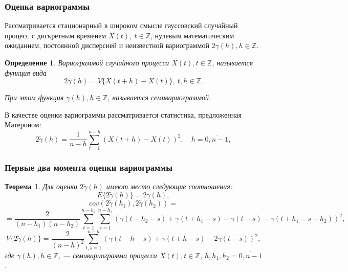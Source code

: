 \documentclass[10pt,pdf,aspectratio=169,hyperref={unicode}]{beamer}
\newtheorem{Definition}{Определение}
\newtheorem{Theorem}{Теорема}
\begin{document}
\begin{frame}
  \frametitle{Оценка вариограммы}
  Рассматривается стационарный в широком смысле гауссовский случайный процесс с дискретным временем $ X(t),~ t \in \mathbb{Z} $, нулевым математическим ожиданием, постоянной дисперсией и неизвестной вариограммой $ 2 \gamma(h), h \in \mathbb{Z} $.
  \begin{Definition}
    \textit{Вариограммой} случайного процесса $ X(t), t \in \mathbb{Z} $, называется функция вида
    \begin{equation}
        2 \gamma (h) = V \{ X(t + h) - X(t) \},~ t, h \in \mathbb{Z}.
    \end{equation}

    При этом функция $ \gamma (h), h \in \mathbb{Z} $, называется \textit{семивариограммой}.
  \end{Definition}
  В качестве оценки вариограммы рассматривается статистика, предложенная Матероном:
  \begin{equation}
    2 \tilde{\gamma}(h) = \frac{1}{n - h} \sum_{t = 1}^{n - h}(X(t + h) - X(t))^2, \quad h = \overline{0, n - 1},
  \end{equation}
\end{frame}

\begin{frame}
  \frametitle{Первые два момента оценки вариограммы}
\begin{Theorem}
  Для оценки $ 2 \tilde{\gamma}(h) $ имеют место следующие соотношения:
  \begin{equation*}
    E \{2 \tilde{\gamma}(h) \} = 2 \gamma(h), %
  \end{equation*}
  \begin{equation*}
    cov(2 \tilde{\gamma}(h_1), 2 \tilde{\gamma}(h_2)) =
  \end{equation*}
  \begin{equation*}
    = \frac{2}{(n - h_1)(n - h_2)} \sum_{t = 1}^{n - h_1}\sum_{s = 1}^{n - h_2} (\gamma(t - h_2 - s) + \gamma(t + h_1 - s) - \gamma(t - s) - \gamma(t + h_1 - s - h_2))^2,
  \end{equation*}
  \begin{equation*}
    V \{ 2 \tilde{\gamma}(h) \} = \frac{2}{(n-h)^2}\sum_{t,s = 1}^{n - h} ( \gamma(t - h - s) + \gamma(t + h - s) - 2\gamma(t - s) )^2,
  \end{equation*}
  где $ \gamma(h), h \in \mathbb{Z} $, --- семивариограмма процесса $ X(t), t \in \mathbb{Z}$, $ h, h_1, h_2 = \overline{0, n - 1} $.
\end{Theorem}
\end{frame}
\end{document}

